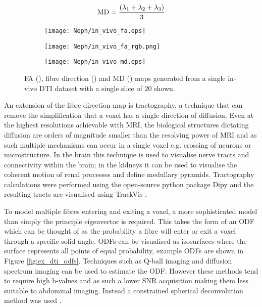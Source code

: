 \begin{equation}
	\textup{MD} = \frac{\left( \lambda_1 + \lambda_2 + \lambda_3 \right)}{3}
	\label{eq:ex_dti_md}
\end{equation}

\begin{figure}[H]
	\centering
	\begin{subfigure}[c]{0.31\textwidth}
		\centering
			\texttt{[image: Neph/in\_vivo\_fa.eps]}
		\caption{}
		\label{fig:ex_dti_fa}
	\end{subfigure}
	\hfill
	\begin{subfigure}[c]{0.31\textwidth}
		\centering
			\texttt{[image: Neph/in\_vivo\_fa\_rgb.png]}
		\caption{}
		\label{fig:ex_dti_fa_rgb}
	\end{subfigure}
	\hfill	
	\begin{subfigure}[c]{0.31\textwidth}
		\centering
			\texttt{[image: Neph/in\_vivo\_md.eps]}
		\caption{}
		\label{fig:ex_dti_md}
	\end{subfigure}
	\caption{\ac{FA} (), fibre direction () and \ac{MD} () maps generated from a single in-vivo \ac{DTI} dataset with a single slice of 20 shown.}
	\label{fig:ex_dti_maps}
\end{figure}

An extension of the fibre direction map is tractography, a technique that can remove the simplification that a voxel has a single direction of diffusion. Even at the highest resolutions achievable with \ac{MRI}, the biological structures dictating diffusion are orders of magnitude smaller than the resolving power of \ac{MRI} and as such multiple mechanisms can occur in a single voxel e.g. crossing of neurons or microstructure. In the brain this technique is used to visualise nerve tracts and connectivity within the brain; in the kidneys it can be used to visualise the coherent motion of renal processes and define medullary pyramids. Tractography calculations were performed using the open-source python package Dipy \cite{garyfallidis_dipy_2014} and the resulting tracts are visualised using TrackVis \cite{wang_diffusion_2007}.

To model multiple fibres entering and exiting a voxel, a more sophisticated model than simply the principle eigenvector is required. This takes the form of an \ac{ODF} which can be thought of as the probability a fibre will enter or exit a voxel through a specific solid angle. \acp{ODF} can be visualised as isosurfaces where the surface represents all points of equal probability, example \acp{ODF} are shown in Figure \ref{fig:ex_dti_odfs}. Techniques such as Q-ball imaging \cite{descoteaux_regularized_2007, hess_q-ball_2006} and diffusion spectrum imaging \cite{descoteaux_regularized_2007} can be used to estimate the \ac{ODF}. However these methods tend to require high b-values and as such a lower \ac{SNR} acquisition making them less suitable to abdominal imaging. Instead a constrained spherical deconvolution method was used \cite{tournier_direct_2004, tournier_robust_2007, tax_recursive_2014}.

